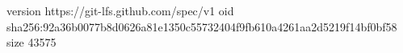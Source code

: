version https://git-lfs.github.com/spec/v1
oid sha256:92a36b0077b8d0626a81e1350c55732404f9fb610a4261aa2d5219f14bf0bf58
size 43575
